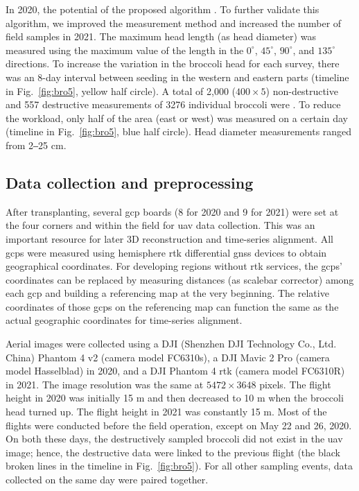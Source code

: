 In 2020,  the potential of the proposed algorithm . To further validate this algorithm, we improved the measurement method and increased the number of field samples in 2021. The maximum head length (as head diameter) was measured using the maximum value of the length in the $0^\circ$, $45^\circ$, $90^\circ$, and $135^\circ$ directions. To increase the variation in the broccoli head for each survey, there was an 8-day interval between seeding in the western and eastern parts (timeline in Fig.~\ref{fig:bro5}, yellow half circle). A total of 2,000 ($400 \times 5$) non-destructive and 557 destructive measurements of 3276 individual broccoli were . To reduce the workload, only half of the area (east or west) was measured on a certain day (timeline in Fig.~\ref{fig:bro5}, blue half circle). Head diameter measurements ranged from 2‒25 cm.

\subsection{Data collection and preprocessing} \label{sec:cp3data}

After transplanting, several \gls{gcp} boards (8 for 2020 and 9 for 2021) were set at the four corners and within the field for \gls{uav} data collection. This was an important resource for later 3D reconstruction and time-series alignment. All \gls{gcp}s were measured using hemisphere \gls{rtk} differential \gls{gnss} devices to obtain geographical coordinates. For developing regions without \gls{rtk} services, the \gls{gcp}s' coordinates can be replaced by measuring distances (as scalebar corrector) among each \gls{gcp} and building a referencing map at the very beginning. The relative coordinates of those \gls{gcp}s on the referencing map can function the same as the actual geographic coordinates for time-series alignment.

Aerial images were collected  using a DJI (Shenzhen DJI Technology Co., Ltd. China) Phantom 4 v2 (camera model FC6310s), a DJI Mavic 2 Pro (camera model Hasselblad) in 2020, and a DJI Phantom 4 \gls{rtk} (camera model FC6310R) in 2021. The image resolution was the same at $5472 \times 3648$ pixels. The flight height in 2020 was initially 15 m and then decreased to 10 m when the broccoli head turned up. The flight height in 2021 was constantly 15 m. Most of the flights were conducted before the field operation, except on May 22 and 26, 2020. On both these days, the destructively sampled broccoli did not exist in the \gls{uav} image; hence, the destructive data were linked to the previous flight (the black broken lines in the timeline in Fig.~\ref{fig:bro5}). For all other sampling events, data collected on the same day were paired together.

